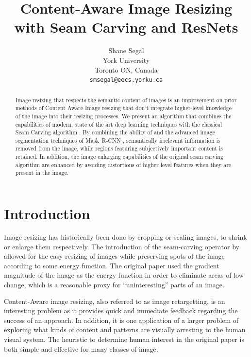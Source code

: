 \documentclass[10pt,twocolumn,letterpaper]{article}
\begin{document}
\title{Content-Aware Image Resizing with Seam Carving and ResNets}

\author{Shane Segal\\
  York University\\
  Toronto ON, Canada\\
  {\tt\small smsegal@eecs.yorku.ca}
}

\maketitle

\begin{abstract}
  Image resizing that respects the semantic content of images is an improvement
  on prior methods of Content Aware Image resizing that don't integrate
  higher-level knowledge of the image into their resizing processes. We present
  an algorithm that combines the capabilities of modern, state of the art deep
  learning techniques with the classical Seam Carving algorithm
  \cite{seamcarve}. By combining the ability of \cite{seamcarve} and the
  advanced image segmentation techniques of Mask~{R-CNN} \cite{maskrcnnpaper},
  semantically irrelevant information is removed from the image, while regions
  featuring subjectively important content is retained. In addition, the image
  enlarging capabilities of the original seam carving algorithm are enhanced by
  avoiding distortions of higher level features when they are present in the
  image.
\end{abstract}

\section{Introduction}

Image resizing has historically been done by cropping or scaling images, to
shrink or enlarge them respectively. The introduction of the seam-carving
operator by \cite{seamcarve} allowed for the easy resizing of images while
preserving spots of the image according to some energy function. The original
paper used the gradient magnitude of the image as the energy function in order
to eliminate areas of low change, which is a reasonable proxy for
``uninteresting'' parts of an image.

Content-Aware image resizing, also referred to as image retargetting, is an
interesting problem as it provides quick and immediate feedback regarding the
success of an approach. In addition, it is one application of a larger problem
of exploring what kinds of content and patterns are visually arresting to the
human visual system. The heuristic to determine human interest in the original
paper is both simple and effective for many classes of image.
\end{document}
